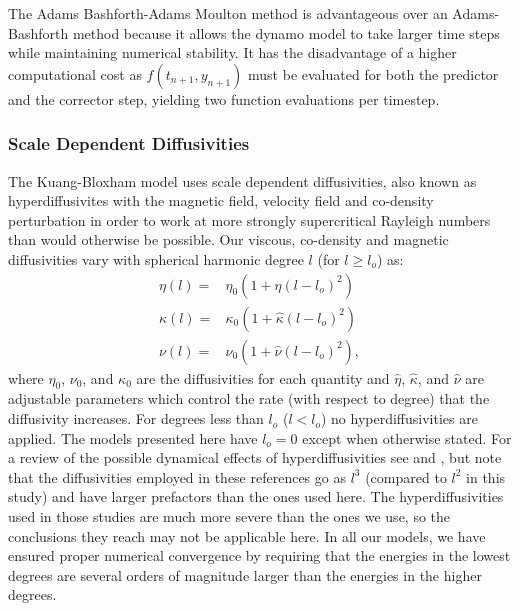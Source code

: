 The Adams Bashforth-Adams Moulton method is advantageous over an Adams-Bashforth method because it allows the dynamo model to take larger time steps while maintaining numerical stability. It has the disadvantage of a higher computational cost as $f(t_{n+1},y_{n+1})$ must be evaluated for both the predictor and the corrector step, yielding two function evaluations per timestep. 

\subsubsection{Scale Dependent Diffusivities}
\label{sec:hyperdiffusivity}
The Kuang-Bloxham model uses scale dependent diffusivities, also known as hyperdiffusivites with the magnetic field, velocity field and co-density perturbation in order to work at more strongly supercritical Rayleigh numbers than would otherwise be possible. Our viscous, co-density and magnetic diffusivities vary with spherical harmonic degree $l$ (for $l\geq l_{o}$) as:
\begin{align}
\eta\left(l\right)= & {} \eta_{0}\left(1+\hat{\eta} \left(l-l_{o}\right)^{2}\right) \label{eq:hyperdiffseta}\\
\kappa\left(l\right)= & {} \kappa_{0}\left(1+\hat{\kappa} \left(l-l_{o}\right)^{2}\right) \label{eq:hyperdiffskappa}\\
\nu\left(l\right)= & {} \nu_{0}\left(1+\hat{\nu} \left(l-l_{o}\right)^{2}\right), \label{eq:hyperdiffsnu} 
\end{align}
where $\eta_{0}$, $\nu_{0}$, and $\kappa_{0}$ are the diffusivities for each quantity and $\hat{\eta}$, $\hat{\kappa}$, and $\hat{\nu}$ are adjustable parameters which control the rate (with respect to degree) that the diffusivity increases. For degrees less than $l_{o}$ ($l<l_{o}$) no hyperdiffusivities are applied. The models presented here have $l_{o}=0$ except when otherwise stated. For a review of the possible dynamical effects of hyperdiffusivities see \citet{zhang1998} and \cite{grote2000}, but note that the diffusivities employed in these references go as $l^3$ (compared to $l^2$ in this study) and have larger prefactors than the ones used here. The hyperdiffusivities used in those studies are much more severe than the ones we use, so the conclusions they reach may not be applicable here. In all our models, we have ensured proper numerical convergence by requiring that the energies in the lowest degrees are several orders of magnitude larger than the energies in the higher degrees.

